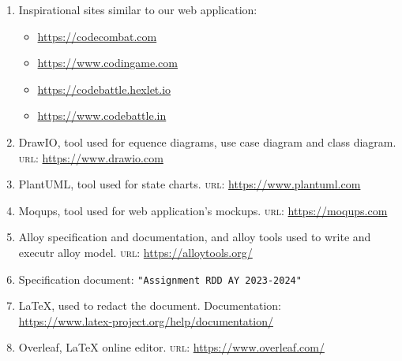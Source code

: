 
\begin{enumerate}
    \item Inspirational sites similar to our web application:
    \begin{itemize}
           \item \url{https://codecombat.com}
           \item \url{https://www.codingame.com}
           \item \url{https://codebattle.hexlet.io}
           \item \url{https://www.codebattle.in}
   \end{itemize}
    \item DrawIO, tool used for equence diagrams, use case diagram and class diagram. \textsc{url}: \url{https://www.drawio.com}
    \item PlantUML, tool used for state charts. \textsc{url}: \url{https://www.plantuml.com}
    \item Moqups, tool used for web application's mockups. \textsc{url}: \url{https://moqups.com}
    \item Alloy specification and documentation, and alloy tools used to write and executr alloy model. \textsc{url}: \url{https://alloytools.org/}
    \item Specification document: \texttt{"Assignment RDD AY 2023-2024"}
    \item \LaTeX, used to redact the document. Documentation:\\
   \url{https://www.latex-project.org/help/documentation/}
   \item Overleaf, \LaTeX \textbf{ }online editor. \textsc{url}:
   \url{https://www.overleaf.com/}
    
\end{enumerate}